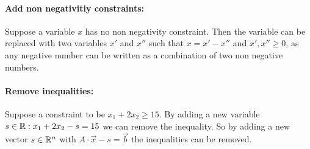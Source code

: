 \begin{pr}
\paragraph*{Add non negativitiy constraints:} Suppose a variable $x$ has no non negativity constraint. Then the variable can be replaced with two variables $x'$ and $x''$ such that $x=x'-x''$ and $x',x''\geq 0$, as any negative number can be written as a combination of two non negative numbers.

\paragraph*{Remove inequalities:} Suppose a constraint to be $x_1+2x_2 \geq 15$. By adding a new variable $s\in \mathbb{R} : x_1+2x_2-s=15$ we can remove the inequality. So by adding a new vector $s\in \mathbb{R}^n$ with $A \cdot \vec x - s = \vec b$ the inequalities can be removed.

\end{pr}